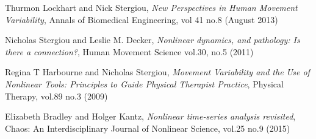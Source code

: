 \documentclass[10pt]{article}
\begin{document}
\begin{thebibliography}{10}

Thurmon Lockhart and Nick Stergiou,
{\it New Perspectives in Human Movement Variability},
{Annals of Biomedical Engineering, vol 41 no.8} (August 2013)

Nicholas Stergiou and Leslie M. Decker,
{\it Nonlinear dynamics, and pathology: Is there a connection?},
{Human Movement Science vol.30, no.5} (2011)

Regina T Harbourne and Nicholas Stergiou,
{\it Movement Variability and the Use of Nonlinear Tools: Principles to Guide
Physical Therapist Practice}, {Physical Therapy, vol.89 no.3}  (2009)

Elizabeth Bradley and Holger Kantz,
{\it Nonlinear time-series analysis revisited}, {Chaos: An Interdisciplinary
Journal of Nonlinear Science, vol.25 no.9}  (2015)



\end{thebibliography}
\end{document}
